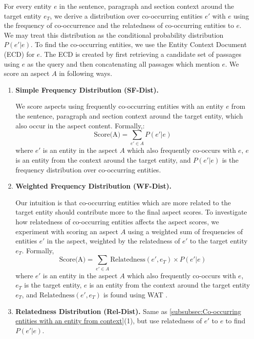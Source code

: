 For every entity $e$ in the sentence, paragraph and section context around the target entity $e_T$, we derive a distribution over co-occurring entities $e'$
with $e$ using the frequency of co-occurrence and the relatedness of co-occurring entities to $e$. We may treat this distribution as the conditional probability distribution $P(e' \vert e)$. To find the co-occurring entities, we use the Entity Context Document (ECD) \cite{chatterjee2019why} for $e$. The ECD is created by first retrieving a candidate set of passages using $e$ as the query and then concatenating all passages which mention $e$.
We score an aspect $A$ in following ways.

\begin{enumerate}
    \item \textbf{Simple Frequency Distribution (SF-Dist).}
    
    We score aspects using frequently co-occurring entities with an entity $e$ from the sentence, paragraph and section context around the target entity, which also occur in the aspect content. Formally,:
    \begin{equation}
    \label{eq:score-aspect-using-simple-freq-dist}
        \text{Score(A)} = \sum_{e' \in A}P(e' \vert e)
    \end{equation}
    where $e'$ is an entity in the aspect $A$ which also frequently co-occurs with $e$, $e$ is an entity from the context around the target entity, and $P( e' \vert e)$ is the frequency distribution over co-occurring entities.
    
    \item \textbf{Weighted Frequency Distribution (WF-Dist).} 
    
    Our intuition is that co-occurring entities which are more related to the target entity should contribute more to the final aspect scores. To investigate how relatedness of co-occurring entities affects the aspect scores, we experiment with scoring an aspect $A$ using a weighted sum of frequencies of entities $e'$ in the aspect, weighted by the relatedness of $e'$ to the target entity $e_T$. Formally,
    \begin{equation}
        \label{eq:score-aspect-using-weighted-freq-dist}
        \text{Score(A)} = \sum_{e' \in A} \text{Relatedness}(e', e_T) \times P(e' \vert e)
    \end{equation}
    where $e'$ is an entity in the aspect $A$ which also frequently co-occurs with $e$, $e_T$ is the target entity, $e$ is an entity from the context around the target entity $e_T$, and $\text{Relatedness}(e', e_T)$ is found using WAT \cite{piccinno2014wat}.

\item \textbf{Relatedness Distribution (Rel-Dist).} 
Same as \ref{subsubsec:Co-occurring entities with an entity from context}(1), but use relatedness of $e'$ to $e$ to find $P( e' \vert e)$.

\end{enumerate}

